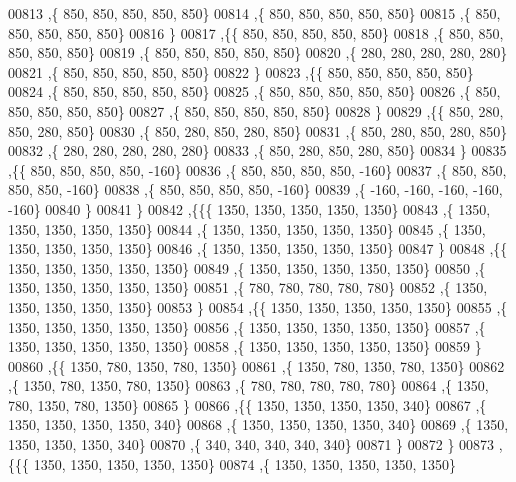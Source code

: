 \begin{DoxyCode}
00813    ,\{   850,   850,   850,   850,   850\}
00814    ,\{   850,   850,   850,   850,   850\}
00815    ,\{   850,   850,   850,   850,   850\}
00816    \}
00817   ,\{\{   850,   850,   850,   850,   850\}
00818    ,\{   850,   850,   850,   850,   850\}
00819    ,\{   850,   850,   850,   850,   850\}
00820    ,\{   280,   280,   280,   280,   280\}
00821    ,\{   850,   850,   850,   850,   850\}
00822    \}
00823   ,\{\{   850,   850,   850,   850,   850\}
00824    ,\{   850,   850,   850,   850,   850\}
00825    ,\{   850,   850,   850,   850,   850\}
00826    ,\{   850,   850,   850,   850,   850\}
00827    ,\{   850,   850,   850,   850,   850\}
00828    \}
00829   ,\{\{   850,   280,   850,   280,   850\}
00830    ,\{   850,   280,   850,   280,   850\}
00831    ,\{   850,   280,   850,   280,   850\}
00832    ,\{   280,   280,   280,   280,   280\}
00833    ,\{   850,   280,   850,   280,   850\}
00834    \}
00835   ,\{\{   850,   850,   850,   850,  -160\}
00836    ,\{   850,   850,   850,   850,  -160\}
00837    ,\{   850,   850,   850,   850,  -160\}
00838    ,\{   850,   850,   850,   850,  -160\}
00839    ,\{  -160,  -160,  -160,  -160,  -160\}
00840    \}
00841   \}
00842  ,\{\{\{  1350,  1350,  1350,  1350,  1350\}
00843    ,\{  1350,  1350,  1350,  1350,  1350\}
00844    ,\{  1350,  1350,  1350,  1350,  1350\}
00845    ,\{  1350,  1350,  1350,  1350,  1350\}
00846    ,\{  1350,  1350,  1350,  1350,  1350\}
00847    \}
00848   ,\{\{  1350,  1350,  1350,  1350,  1350\}
00849    ,\{  1350,  1350,  1350,  1350,  1350\}
00850    ,\{  1350,  1350,  1350,  1350,  1350\}
00851    ,\{   780,   780,   780,   780,   780\}
00852    ,\{  1350,  1350,  1350,  1350,  1350\}
00853    \}
00854   ,\{\{  1350,  1350,  1350,  1350,  1350\}
00855    ,\{  1350,  1350,  1350,  1350,  1350\}
00856    ,\{  1350,  1350,  1350,  1350,  1350\}
00857    ,\{  1350,  1350,  1350,  1350,  1350\}
00858    ,\{  1350,  1350,  1350,  1350,  1350\}
00859    \}
00860   ,\{\{  1350,   780,  1350,   780,  1350\}
00861    ,\{  1350,   780,  1350,   780,  1350\}
00862    ,\{  1350,   780,  1350,   780,  1350\}
00863    ,\{   780,   780,   780,   780,   780\}
00864    ,\{  1350,   780,  1350,   780,  1350\}
00865    \}
00866   ,\{\{  1350,  1350,  1350,  1350,   340\}
00867    ,\{  1350,  1350,  1350,  1350,   340\}
00868    ,\{  1350,  1350,  1350,  1350,   340\}
00869    ,\{  1350,  1350,  1350,  1350,   340\}
00870    ,\{   340,   340,   340,   340,   340\}
00871    \}
00872   \}
00873  ,\{\{\{  1350,  1350,  1350,  1350,  1350\}
00874    ,\{  1350,  1350,  1350,  1350,  1350\}

\end{DoxyCode}
